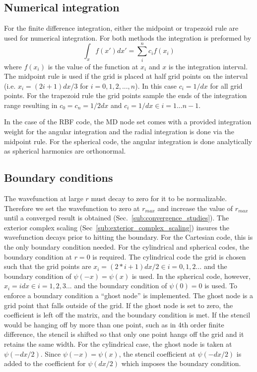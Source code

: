 \subsection{Numerical integration} %
\label{sub:numerical_integration}
For the finite difference integration, either the midpoint or trapezoid rule are used for numerical integration. For both methods the integration is preformed by 
\begin{equation}
    \int_{x} f(x')dx' = \sum_i^n c_i f(x_i)
\end{equation}
where $f(x_i)$ is the value of the function at $x_i$ and $x$ is the integration interval. The midpoint rule is used if the grid is placed at half grid points on the interval (i.e. $x_i = (2i+1)dx/3$ for $i=0,1,2,...,n$). In this case $c_i = 1/dx$ for all grid points. For the trapezoid rule the grid points sample the ends of the integration range resulting in $c_0 = c_n = 1/2dx$ and $c_i = 1/dx \in i=1...n-1$. 

In the case of the RBF code, the MD node set comes with a provided integration weight for the angular integration and the radial integration is done via the midpoint rule. 
For the spherical code, the angular integration is done analytically as spherical harmonics are orthonormal.

\subsection{Boundary conditions} %
\label{sub:boundary_conditions}
The wavefunction at large $r$ must decay to zero for it to be normalizable. Therefore we set the wavefunction to zero at $r_{max}$ and increase the value of $r_{max}$ until a converged result is obtained (Sec.~\ref{sub:convergence_studies}). The exterior complex scaling (Sec~\ref{sub:exterior_complex_scaling}) insures the wavefunction decays prior to hitting the boundary. For the Cartesian code, this is the only boundary condition needed. For the cylindrical and spherical codes, the boundary condition at $r=0$ is required. The cylindrical code the grid is chosen such that the grid points are $x_i = (2*i+1)dx/2 \in i=0,1,2...$ and the boundary condition of $\psi(-x)=\psi(x)$ is used. In the spherical code, however, $x_i = idx \in i=1,2,3...$ and the boundary condition of $\psi(0)=0$ is used. To enforce a boundary condition a ``ghost node'' is implemented. The ghost node is a grid point that falls outside of the grid. If the ghost node is set to zero, the coefficient is left off the matrix, and the boundary condition is met. If the stencil would be hanging off by more than one point, such as in 4th order finite difference, the stencil is shifted so that only one point hangs off the grid and it retains the same width. For the cylindrical case, the ghost node is taken at $\psi(-dx/2)$. Since $\psi(-x)=\psi(x)$, the stencil coefficient at $\psi(-dx/2)$ is added to the coefficient for $\psi(dx/2)$ which imposes the boundary condition.

